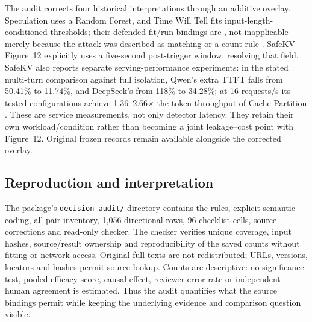 The audit corrects four historical interpretations through an additive overlay. Speculation uses a Random Forest, and Time Will Tell fits input-length-conditioned thresholds; their defended-fit/run bindings are \NRV{}, not inapplicable merely because the attack was described as matching or a count rule \cite{wei2024speculation,timewilltell2024}. SafeKV Figure~12 explicitly uses a five-second post-trigger window, resolving that field. SafeKV also reports separate serving-performance experiments: in the stated multi-turn comparison against full isolation, Qwen's extra TTFT falls from 50.41\% to 11.74\%, and DeepSeek's from 118\% to 34.28\%; at 16 requests/s its tested configurations achieve 1.36--2.66$\times$ the token throughput of Cache-Partition \cite{chu2025safekv}. These are service measurements, not only detector latency. They retain their own workload/condition rather than becoming a joint leakage--cost point with Figure~12. Original frozen records remain available alongside the corrected overlay.

\subsection{Reproduction and interpretation}
The package's \texttt{decision-audit/} directory contains the rules, explicit semantic coding, all-pair inventory, 1,056 directional rows, 96 checklist cells, source corrections and read-only checker. The checker verifies unique coverage, input hashes, source/result ownership and reproducibility of the saved counts without fitting or network access. Original full texts are not redistributed; URLs, versions, locators and hashes permit source lookup. Counts are descriptive: no significance test, pooled efficacy score, causal effect, reviewer-error rate or independent human agreement is estimated. Thus the audit quantifies what the source bindings permit while keeping the underlying evidence and comparison question visible.
